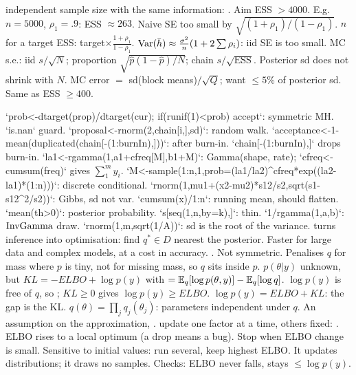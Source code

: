 \sk{} independent sample size with the same information: . Aim ESS $>4000$. E.g. $n=5000$, $\rho_1=.9$: ESS $\approx263$. Naive SE too small by $\sqrt{(1+\rho_1)/(1-\rho_1)}$. $n$ for a target ESS: target$\times\frac{1+\rho_1}{1-\rho_1}$.
\sk{} $\mathrm{Var}(\bar h)\approx\frac{\sigma^2}n(1+2\sum\rho_i)$: iid SE is too small. MC s.e.: iid $s/\sqrt N$; proportion $\sqrt{\hat p(1-\hat p)/N}$; chain $s/\sqrt{\mathrm{ESS}}$. Posterior sd does not shrink with $N$.  MC error $=$ sd(block means)$/\sqrt Q$; want $\le5\%$ of posterior sd. Same as ESS $\ge400$.
\bx
{}\par
\li`prob<-dtarget(prop)/dtarget(cur); if(runif(1)<prob) accept`: symmetric MH. `is.nan` guard. `proposal<-rnorm(2,chain[i,],sd)`: random walk.
\li`acceptance<-1-mean(duplicated(chain[-(1:burnIn),]))`: after burn-in. `chain[-(1:burnIn),]` drops burn-in.
\li`la1<-rgamma(1,a1+cfreq[M],b1+M)`: Gamma(shape, rate); `cfreq<-cumsum(freq)` gives $\sum_1^my_i$.
\li`M<-sample(1:n,1,prob=(la1/la2)^cfreq*exp((la2-la1)*(1:n)))`: discrete conditional.
\li`rnorm(1,mu1+(x2-mu2)*s12/s2,sqrt(s1-s12^2/s2))`: Gibbs, sd not var.
\li`cumsum(x)/1:n`: running mean, should flatten. `mean(th>0)`: posterior probability. `s[seq(1,n,by=k),]`: thin.
\li`1/rgamma(1,a,b)`: $\mathrm{InvGamma}$ draw. `rnorm(1,m,sqrt(1/A))`: sd is the root of the variance.
 turns inference into optimisation: find $q^*\in D$ nearest the posterior. Faster for large data and complex models, at a cost in accuracy.
\sk{} . Not symmetric. Penalises $q$ for mass where $p$ is tiny, not for missing mass, so $q$ sits inside $p$.
\sk{} $p(\theta|y)$ unknown, but $KL=-ELBO+\log p(y)$ with
$=\mathbb{E}_q[\log p(\theta,y)]-\mathbb{E}_q[\log q]$. $\log p(y)$ is free of $q$, so ; $KL\ge0$ gives $\log p(y)\ge ELBO$. $\log p(y)=ELBO+KL$: the gap is the KL.
\sk{} $q(\theta)=\prod_jq_j(\theta_j)$: parameters independent under $q$. An assumption on the approximation, .
\sk{} update one factor at a time, others fixed: . ELBO rises to a local optimum (a drop means a bug). Stop when ELBO change is small. Sensitive to initial values: run several, keep highest ELBO. It updates distributions; it draws no samples. Checks: ELBO never falls, stays $\le\log p(y)$.
